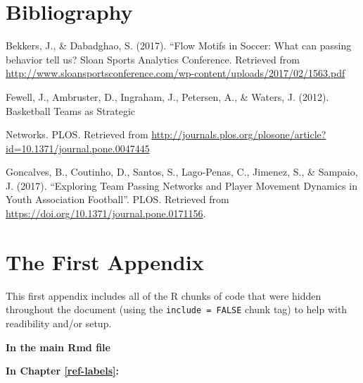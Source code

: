 \documentclass[12pt,twoside]{dukestatscithesis}
\theoremstyle{definition}
\theoremstyle{definition}
\theoremstyle{definition}
\theoremstyle{remark}
\begin{document}
\chapter{Bibliography}\label{bibliography-1}

Bekkers, J., \& Dabadghao, S. (2017). ``Flow Motifs in Soccer: What can
passing behavior tell us? Sloan Sports Analytics Conference. Retrieved
from
\url{http://www.sloansportsconference.com/wp-content/uploads/2017/02/1563.pdf}

Fewell, J., Ambruster, D., Ingraham, J., Petersen, A., \& Waters, J.
(2012). Basketball Teams as Strategic

Networks. PLOS. Retrieved from
\url{http://journals.plos.org/plosone/article?id=10.1371/journal.pone.0047445}

Goncalves, B., Coutinho, D., Santos, S., Lago-Penas, C., Jimenez, S., \&
Sampaio, J. (2017). ``Exploring Team Passing Networks and Player
Movement Dynamics in Youth Association Football''. PLOS. Retrieved from
\url{https://doi.org/10.1371/journal.pone.0171156}.

\appendix

\chapter{The First Appendix}\label{the-first-appendix}

This first appendix includes all of the R chunks of code that were
hidden throughout the document (using the \texttt{include\ =\ FALSE}
chunk tag) to help with readibility and/or setup.

\textbf{In the main Rmd file}
\begin{Shaded}
\begin{Highlighting}[]
\NormalTok{(}\OperatorTok{!}
  \NormalTok{(}\NormalTok{, } \NormalTok{)}
\NormalTok{(}\OperatorTok{!}
\OperatorTok{::}\NormalTok{(}\NormalTok{)}
\end{Highlighting}
\end{Shaded}
\textbf{In Chapter \ref{ref-labels}:}
\end{document}
